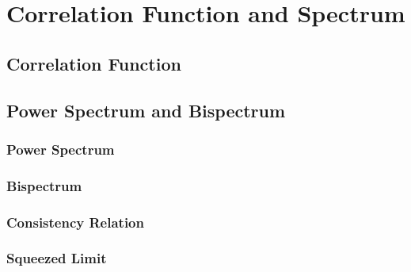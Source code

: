 \chapter{Correlation Function and Spectrum}

\section{Correlation Function}

\section{Power Spectrum and Bispectrum}
\subsection{Power Spectrum}

\subsection{Bispectrum}

\subsection{Consistency Relation}


\subsection{Squeezed Limit}
